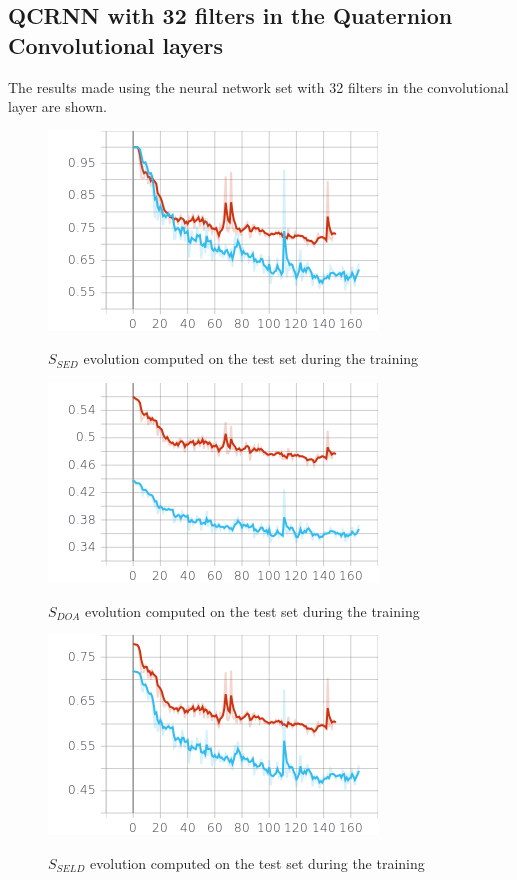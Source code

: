 \documentclass{article}
\begin{document}
	\subsection*{QCRNN with 32 filters in the Quaternion Convolutional layers}
	The results made using the neural network set with 32 filters in the convolutional layer are shown.
	\begin{figure}[hbt!]
		\centering
		\includegraphics[height=0.34\textwidth]{images/sed_score.png} \\
		\caption{$S_{SED}$ evolution computed on the test set during the training}
	\end{figure}
	\begin{figure}[hbt!]
		\centering
		\includegraphics[height=0.34\textwidth]{images/doa_score.png} \\
		\caption{$S_{DOA}$ evolution computed on the test set during the training}
	\end{figure}
	\begin{figure}[hbt!]
		\centering
		\includegraphics[height=0.34\textwidth]{images/seld_score.png}\\
		\caption{$S_{SELD}$ evolution computed on the test set during the training}
	\end{figure}
\end{document}
